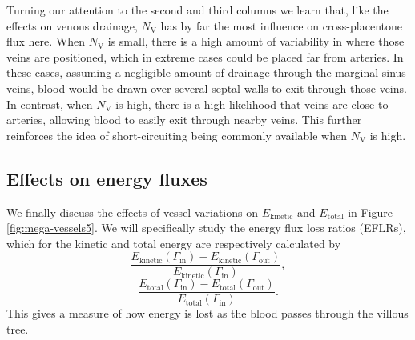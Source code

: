             Turning our attention to the second and third columns we learn that, like the effects on venous drainage, $N_\text{V}$ has by far the most influence on cross-placentone flux here. When $N_\text{V}$ is small, there is a high amount of variability in where those veins are positioned, which in extreme cases could be placed far from arteries. In these cases, assuming a negligible amount of drainage through the marginal sinus veins, blood would be drawn over several septal walls to exit through those veins. In contrast, when $N_\text{V}$ is high, there is a high likelihood that veins are close to arteries, allowing blood to easily exit through nearby veins. This further reinforces the idea of short-circuiting being commonly available when $N_\text{V}$ is high.

        \subsection{Effects on energy fluxes}
            We finally discuss the effects of vessel variations on $E_\text{kinetic}$ and $E_\text{total}$ in Figure \ref{fig:mega-vessels5}. We will specifically study the energy flux loss ratios (EFLRs), which for the kinetic and total energy are respectively calculated by
            \begin{equation*}
                \frac{E_\text{kinetic}(\Gamma_\text{in}) - E_\text{kinetic}(\Gamma_\text{out})}{E_\text{kinetic}(\Gamma_\text{in})},
            \end{equation*}
            \begin{equation*}
                \frac{E_\text{total}(\Gamma_\text{in}) - E_\text{total}(\Gamma_\text{out})}{E_\text{total}(\Gamma_\text{in})}.
            \end{equation*}
            This gives a measure of how energy is lost as the blood passes through the villous tree.

